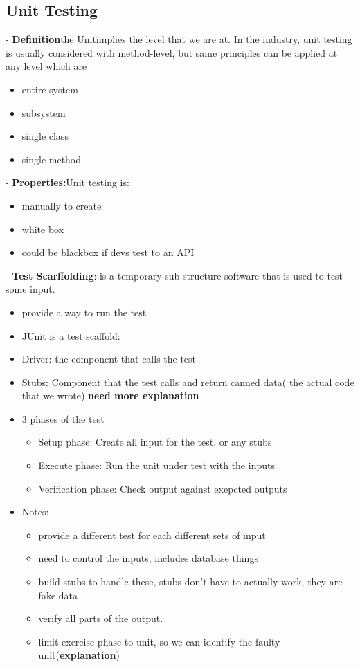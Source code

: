 \documentclass{article}
\begin{document}
  \subsection{ Unit Testing}
  - \textbf{Definition}the \" Unit\" implies the level that we are at. In the
  industry, unit testing is usually considered with method-level, but same principles can be
  applied at any level which are\\
  \begin{itemize}
    \item entire system
    \item subsystem
    \item single class
    \item single method
  \end{itemize}
  - \textbf{Properties:}Unit testing is: \\ 
  \begin{itemize}
    \item manually to create
    \item white box
    \item could be blackbox if devs test to an API
  \end{itemize}
  - \textbf{Test Scarffolding}: is a temporary sub-structure software that is
  used to test some input.\\
  \begin{itemize}
    \item provide a way to run the test
    \item JUnit is a test scaffold: 
    \item Driver: the component that calls the test
    \item Stubs: Component that the test calls and return canned data( the
    actual code that we wrote) \textbf{need more explanation}
    \item 3 phases of the test
    \begin{itemize}
      \item Setup phase: Create all input for the test, or any stubs
      \item Execute phase: Run the unit under test with the inputs
      \item Verification phase: Check output against exepcted outputs
    \end{itemize}
    \item Notes: 
    \begin{itemize}
      \item provide a different test for each different sets of input
      \item need to control the inputs, includes database things
      \item build stubs to handle these, stubs don't have to actually work, they
      are fake data
      \item verify all parts of the output.
      \item limit exercise phase to unit, so we can identify the
      faulty unit(\textbf{explanation})
      \end{itemize}
  \end{itemize}
  
\end{document}
